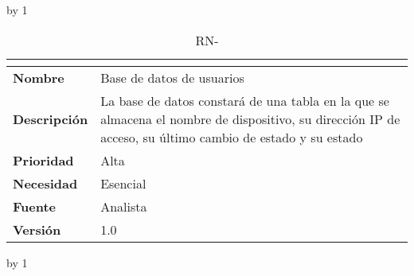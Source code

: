 \advance\rn by 1
\begin{table}[H]
	\caption{RN-\number\rn}
	\begin{tabular}{|l|p{}|}
		\hline
		\multicolumn{2}{|c|}{\cellcolor[HTML]{BFBFBF}{\color[HTML]{000000} \textbf{RN-\number\rn}}} \\ \hline
		\textbf{Nombre}      & Base de datos de usuarios                                                                                                                                \\ \hline
		\textbf{Descripción} & La base de datos constará de una tabla en la que se almacena el nombre de dispositivo, su dirección IP de acceso, su último cambio de estado y su estado \\ \hline
		\textbf{Prioridad}   & Alta                                                                                                                                                     \\ \hline
		\textbf{Necesidad}   & Esencial                                                                                                                                                 \\ \hline
		\textbf{Fuente}      & Analista                                                                                                                                                 \\ \hline
		\textbf{Versión}     & 1.0                                                                                                                                                      \\ \hline
	\end{tabular}
\end{table}
\advance\rn by 1
